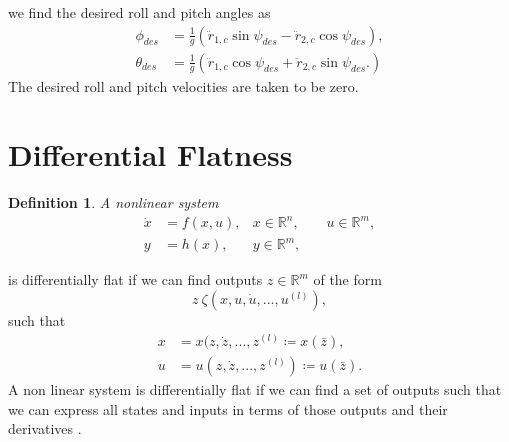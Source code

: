 \documentclass[conference,onecolumn,10pt]{IEEEtran}
\newtheorem{definition}{Definition}
\begin{document}
we find the desired roll and pitch angles as 
\begin{equation}
\begin{aligned}
\phi_{des} &= \frac{1}{g}(\ddot{r}_{1,c}\sin \psi_{des} - \ddot{r}_{2,c}\cos \psi_{des} ), \\
\theta_{des} &= \frac{1}{g}(\ddot{r}_{1,c}\cos \psi_{des} + \ddot{r}_{2,c}\sin \psi_{des}. )
\end{aligned}
\end{equation}
The desired roll and pitch velocities are taken to be zero.
\section{Differential Flatness}
\begin{definition}
A nonlinear system 
\begin{equation}
\label{xdot}
\begin{aligned}
\dot{x} &= f(x,u), & x \in \mathbb{R}^n, & \quad u \in \mathbb{R}^m,\\
y &= h(x),   & y \in \mathbb{R}^m, &
\end{aligned}
\end{equation}
\end{definition}
is differentially flat if we can find outputs $z \in \mathbb{R}^m$ of the form 
\begin{equation}
\label{z}
z \ \zeta(x,u,\dot{u},...,u^{(l)}),
\end{equation} 
such that 
\begin{equation}
\begin{aligned}
x &= x(z ,\dot{z}, ...,z^{(l)} \coloneqq x(\bar{z}),\\
u &= u(z,\dot{z},...,z^{(l)}) \coloneqq u(\bar{z}).
\end{aligned}
\end{equation}
A non linear system is differentially flat if we can find a set of outputs such that we can express all states and inputs in terms of those outputs and their derivatives \cite{van1997real}. 
\end{document}
